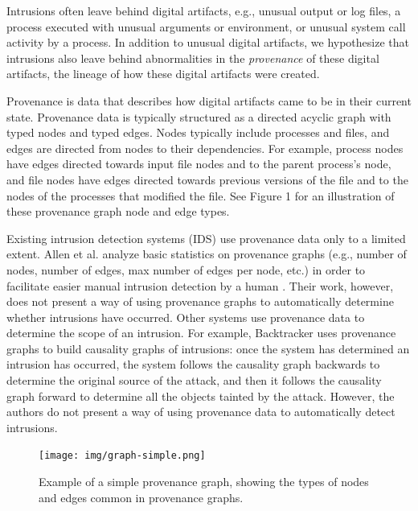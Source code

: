 \documentclass[10pt,twocolumn]{article}
\begin{document}
Intrusions often leave behind digital artifacts, e.g., unusual output or log files, a process executed
with unusual arguments or environment, or unusual system call activity by a process. In addition to
unusual digital artifacts, we hypothesize that
intrusions also leave behind abnormalities
in the {\em provenance} of these digital artifacts, the lineage of how these digital artifacts were created.

Provenance is data that describes how digital artifacts
came to be in their current state. Provenance data is typically structured as a directed acyclic graph with
typed nodes and typed edges.
Nodes typically include processes and files, and edges are directed from nodes to their dependencies. For example,
process nodes have edges directed towards input file nodes and to the parent process's node, and
file nodes have edges directed towards previous versions of the file and to the nodes of the
processes that modified the file. See Figure 1 for an illustration of these provenance
graph node and edge types.

Existing intrusion detection systems (IDS) use provenance data only to a limited extent.
Allen et al. analyze
basic statistics on provenance graphs (e.g., number of nodes, number of edges, max number of edges per node, etc.) in order to facilitate
easier manual intrusion detection by a human \cite{provstat}. Their work, however, does not present a way of using provenance
graphs to automatically determine whether intrusions have occurred. Other systems use provenance data to determine the scope of an
intrusion. For example, Backtracker \cite{backtracker} uses provenance graphs to build causality graphs of intrusions: once the
system has
determined an intrusion has occurred, the system follows the causality graph backwards to determine the original source of the attack, and 
then it follows the causality graph forward to determine all the objects tainted by the attack. However, the authors 
do not present a way of using provenance data to automatically detect intrusions.

\begin{figure}
  \label{graph-simple}
  \centering
    \texttt{[image: img/graph-simple.png]}
    \caption{Example of a simple provenance graph, showing the types of nodes and edges common in provenance graphs.} 
\end{figure}
\end{document}
